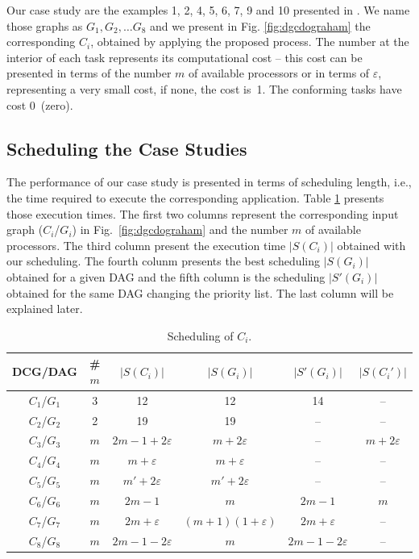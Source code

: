 \documentclass[twocolumn]{svjour3}
\begin{document}
Our case study are the examples 1, 2, 4, 5, 6, 7, 9 and 10 presented in \cite{Graham76}. We name those graphs as $G_1, G_2, \dots G_8$ and we present in Fig. \ref{fig:dgcdograham} the corresponding $C_i$, obtained by applying the proposed process. The number at the interior of each task represents its computational cost – this cost can be presented in terms of the number $m$ of available processors or in terms of $\varepsilon$, representing a very small cost, if none, the cost is~1. The conforming tasks have cost 0~(zero).

\subsection{Scheduling the Case Studies}

The performance of our case study is presented in terms of scheduling length, i.e., the time required to execute the corresponding application. Table \ref{tab:resultados} presents those execution times. The first two columns represent the corresponding input graph ($C_i$/$G_i$) in Fig.~\ref{fig:dgcdograham} and the number $m$ of available processors. The third column present the execution time $|S(C_i)|$ obtained with our scheduling. The fourth colunm presents the best scheduling $|S(G_i)|$ obtained for a given DAG and the fifth column is the scheduling $|S'(G_i)|$ obtained for the same DAG changing the priority list. The last column will be explained later.

\begin{table}
\begin{center}
\caption{Scheduling of $C_i$.}\label{tab:resultados}
\begin{tabular}{c|c||c||c|c||c}
DCG/DAG & \# $m$ & $|S(C_i)|$ & $|S(G_i)|$ & $|S'(G_i)|$ & $|S(C_i')|$\\ \hline\hline
$C_1$/$G_1$ & 3 & 12 & 12 & 14 & --\\ \hline
$C_2$/$G_2$ & 2 & 19 & 19 & -- & --\\ \hline
$C_3$/$G_3$ & $m$ & $2m-1+2\varepsilon$ & $m+2\varepsilon$ & -- & $m+2\varepsilon$ \\ \hline
$C_4$/$G_4$ & $m$ & $m+\varepsilon$ & $m+\varepsilon$ & -- & --\\ \hline
$C_5$/$G_5$ & $m$ & $m'+2\varepsilon$ & $m'+2\varepsilon$  & -- & --\\ \hline
$C_6$/$G_6$ & $m$ & $2m-1$ & $m$ & $2m-1$ & $m$\\ \hline
$C_7$/$G_7$ & $m$ & $2m+\varepsilon$ & $(m+1)(1+\varepsilon)$ & $2m+\varepsilon$ & --\\ \hline
$C_8$/$G_8$ & $m$ & $2m-1-2\varepsilon$ & $m$ & $2m-1-2\varepsilon$ & --\\ \hline
\end{tabular}
\end{center}
\end{table}
\end{document}
